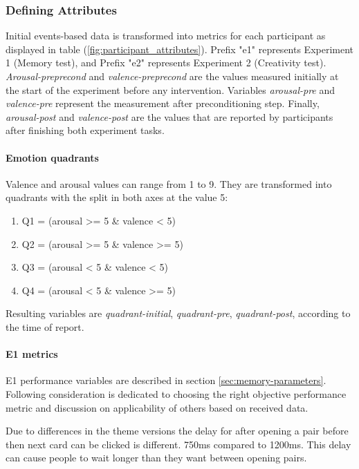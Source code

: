 	\subsubsection{Defining Attributes} Initial events-based data is transformed into metrics for each participant as displayed in table (\ref{fig:participant_attributes}). Prefix "e1" represents Experiment 1 (Memory test), and Prefix "e2" represents Experiment 2 (Creativity test). \textit{Arousal-preprecond} and \textit{valence-preprecond} are the values measured initially at the start of the experiment before any intervention. Variables \textit{arousal-pre} and \textit{valence-pre} represent the measurement after preconditioning step. Finally, \textit{arousal-post} and \textit{valence-post} are the values that are reported by participants after finishing both experiment tasks.

	\paragraph{Emotion quadrants}
	
	Valence and arousal values can range from 1 to 9. They are transformed into quadrants with the split in both axes at the value 5:
	
	\begin{enumerate}
		\item Q1 = (arousal >= 5 \& valence  < 5)
		\item Q2 = (arousal >= 5 \& valence  >= 5)
		\item Q3 = (arousal < 5 \& valence  < 5)
		\item Q4 = (arousal < 5 \& valence  >= 5)
	\end{enumerate}
	
	Resulting variables are \textit{quadrant-initial}, \textit{quadrant-pre}, \textit{quadrant-post}, according to the time of report.
	
	\paragraph{E1 metrics} \label{sec:e1metrics}
	
	E1 performance variables are described in section \ref{sec:memory-parameters}. Following consideration is dedicated to choosing the right objective performance metric and discussion on applicability of others based on received data.
	
	Due to differences in the theme versions the delay for after opening a pair before then next card can be clicked is different. 750ms compared to 1200ms. This delay can cause people to wait longer than they want between opening pairs.
	

